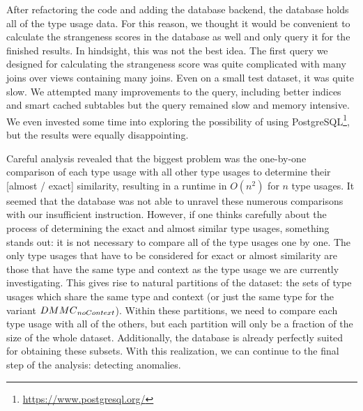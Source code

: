 After refactoring the code and adding the database backend, the database holds all of the type usage data.
For this reason, we thought it would be convenient to calculate the strangeness scores in the database as well and only query it for the finished results.
In hindsight, this was not the best idea.
The first query we designed for calculating the strangeness score was quite complicated with many joins over views containing many joins.
Even on a small test dataset, it was quite slow.
We attempted many improvements to the query, including better indices and smart cached subtables but the query remained slow and memory intensive.
We even invested some time into exploring the possibility of using PostgreSQL\footnote{\url{https://www.postgresql.org/}}, but the results were equally disappointing.

Careful analysis revealed that the biggest problem was the one-by-one comparison of each type usage with all other type usages to determine their [almost / exact] similarity, resulting in a runtime in $O(n^2)$ for $n$ type usages.
It seemed that the database was not able to unravel these numerous comparisons with our insufficient instruction.
However, if one thinks carefully about the process of determining the exact and almost similar type usages, something stands out: it is not necessary to compare all of the type usages one by one.
The only type usages that have to be considered for exact or almost similarity are those that have the same type and context as the type usage we are currently investigating.
This gives rise to natural partitions of the dataset: the sets of type usages which share the same type and context (or just the same type for the variant $\mathnormal{DMMC}_\mathnormal{noContext}$).
Within these partitions, we need to compare each type usage with all of the others, but each partition will only be a fraction of the size of the whole dataset.
Additionally, the database is already perfectly suited for obtaining these subsets.
With this realization, we can continue to the final step of the analysis: detecting anomalies.

